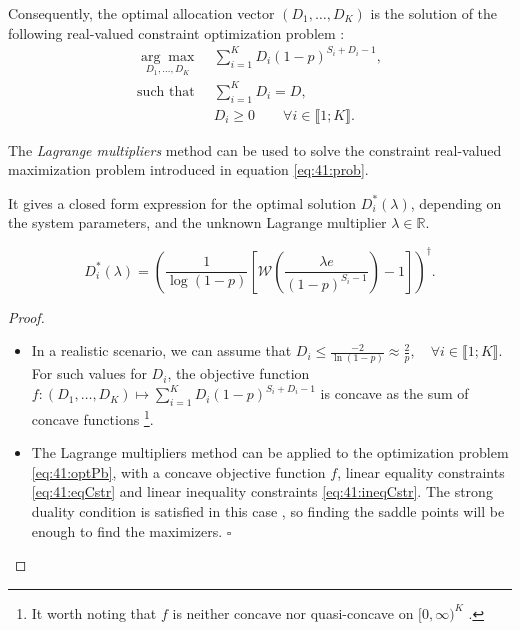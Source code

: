 Consequently, the optimal allocation vector $(D_1,\dots,D_{K})$ is the solution of the following real-valued constraint optimization problem :
\begin{subequations}
\label{eq:41:prob}
\begin{align}
\underset{D_1,\dots,D_{K}}{\arg\max}\; & \sum_{i=1}^{K} D_i (1 - p)^{S_i + D_i -1}, \label{eq:41:optPb}\\
\text{such that}\;\; & \sum_{i=1}^{K} D_i = D, \label{eq:41:eqCstr}\\
& D_i \geq 0 \qquad \forall i\in\llbracket 1;K\rrbracket . \label{eq:41:ineqCstr}
\end{align}
\end{subequations}

\begin{proposition}\label{prop:41:Lagrangian}
The \emph{Lagrange multipliers} method \cite{BoydVanderberghe04} can be used to solve the constraint real-valued maximization problem introduced in equation \eqref{eq:41:prob}.

It gives a closed form expression for the optimal solution $D_i^*(\lambda)$, depending on the system parameters, and the unknown Lagrange multiplier $\lambda \in \mathbb{R}$.

\begin{equation}\label{eq:41:Dilambda}
D_i^*(\lambda) = \left(\frac{1}{\log(1-p)}\left[ \mathcal{W}\left(\frac{\lambda e}{(1-p)^{S_i-1}} \right)-1 \right]\right)^{\dag} .
\end{equation}
\end{proposition}
\begin{proof}
\begin{itemize}
    \item
    In a realistic scenario, we can assume that $D_i\leq \frac{-2}{\ln\left(1-p\right)} \approx \frac{2}{p},\quad \forall i\in\llbracket 1;K \rrbracket$. For such values for $D_i$, the objective function $f: (D_1, \dots, D_{K}) \mapsto \sum_{i=1}^{K} D_i (1 - p)^{S_i + D_i -1}$ is concave as the sum of concave functions
    \footnote{It worth noting that $f$ is neither concave nor quasi-concave on $[0,\infty)^{K}$ \cite{Luenberger68,Yaari77}.}.
        \item
The Lagrange multipliers method can be applied to the optimization problem \eqref{eq:41:optPb}, with a concave objective function $f$, linear equality constraints \eqref{eq:41:eqCstr} and linear inequality constraints \eqref{eq:41:ineqCstr}. The strong duality condition is satisfied in this case \cite{BoydVanderberghe04}, so finding the saddle points will be enough to find the maximizers.
    \hfill{}$\square$
    \end{itemize}
\end{proof}

